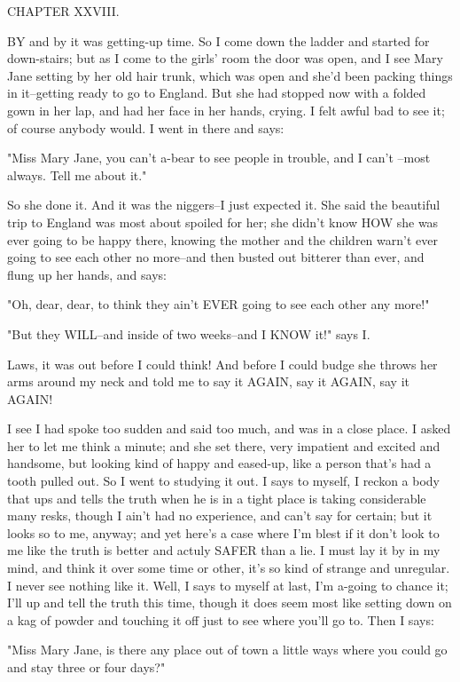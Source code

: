 CHAPTER XXVIII.

BY and by it was getting-up time.  So I come down the ladder and started
for down-stairs; but as I come to the girls' room the door was open, and
I see Mary Jane setting by her old hair trunk, which was open and she'd
been packing things in it--getting ready to go to England.  But she had
stopped now with a folded gown in her lap, and had her face in her hands,
crying.  I felt awful bad to see it; of course anybody would.  I went in
there and says:

"Miss Mary Jane, you can't a-bear to see people in trouble, and I can't
--most always.  Tell me about it."

So she done it.  And it was the niggers--I just expected it.  She said
the beautiful trip to England was most about spoiled for her; she didn't
know HOW she was ever going to be happy there, knowing the mother and the
children warn't ever going to see each other no more--and then busted out
bitterer than ever, and flung up her hands, and says:

"Oh, dear, dear, to think they ain't EVER going to see each other any
more!"

"But they WILL--and inside of two weeks--and I KNOW it!" says I.

Laws, it was out before I could think!  And before I could budge she
throws her arms around my neck and told me to say it AGAIN, say it AGAIN,
say it AGAIN!

I see I had spoke too sudden and said too much, and was in a close place.
I asked her to let me think a minute; and she set there, very impatient
and excited and handsome, but looking kind of happy and eased-up, like a
person that's had a tooth pulled out.  So I went to studying it out.  I
says to myself, I reckon a body that ups and tells the truth when he is
in a tight place is taking considerable many resks, though I ain't had no
experience, and can't say for certain; but it looks so to me, anyway; and
yet here's a case where I'm blest if it don't look to me like the truth
is better and actuly SAFER than a lie.  I must lay it by in my mind, and
think it over some time or other, it's so kind of strange and unregular.
I never see nothing like it.  Well, I says to myself at last, I'm a-going
to chance it; I'll up and tell the truth this time, though it does seem
most like setting down on a kag of powder and touching it off just to see
where you'll go to. Then I says:

"Miss Mary Jane, is there any place out of town a little ways where you
could go and stay three or four days?"

